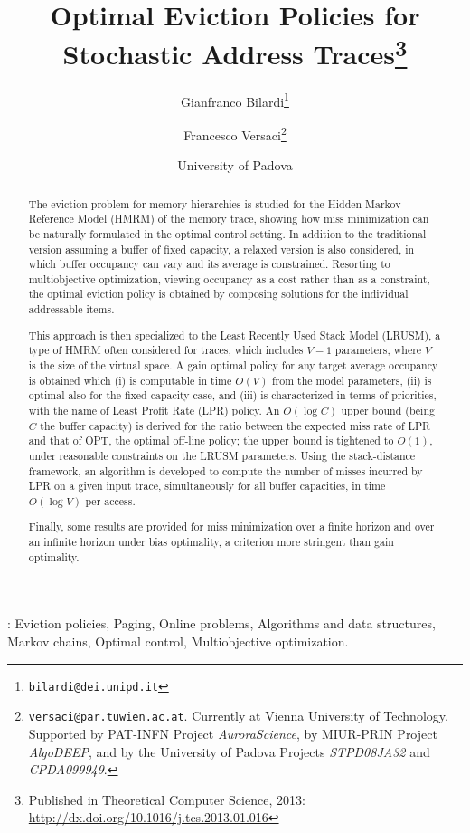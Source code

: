 \documentclass[11pt,a4paper]{article}
\title{Optimal Eviction Policies for Stochastic Address
  Traces\footnote{Published in Theoretical Computer Science, 2013:
    \url{http://dx.doi.org/10.1016/j.tcs.2013.01.016}}}
\author{Gianfranco Bilardi\thanks{\texttt{bilardi@dei.unipd.it}} \and Francesco
  Versaci\thanks{\texttt{versaci@par.tuwien.ac.at}. {Currently at Vienna
      University of Technology. Supported by PAT-INFN Project
      \emph{AuroraScience}, by MIUR-PRIN Project \emph{AlgoDEEP}, and by the
      University of Padova Projects \emph{STPD08JA32} and \emph{CPDA099949}.}}}
\date{University of Padova}
\theoremstyle{definition}
\theoremstyle{remark}
\begin{document}
\maketitle

\begin{abstract}
  The eviction problem for memory hierarchies is studied for the
  Hidden Markov Reference Model (HMRM) of the memory trace,
  showing how miss minimization can be naturally formulated in
  the optimal control setting.
    In addition to the traditional version assuming a buffer of fixed
  capacity, a relaxed version is also considered, in which buffer
  occupancy can vary and its average is constrained.
    Resorting to multiobjective optimization, viewing occupancy as a
  cost rather than as a constraint, the optimal eviction policy is
  obtained by composing solutions for the individual addressable
  items.

  This approach is then specialized to the Least Recently Used Stack Model
  (LRUSM), a type of HMRM often considered for traces, which includes $V-1$
  parameters, where $V$ is the size of the virtual space. A gain optimal policy
  for any target average occupancy is obtained which (i) is computable in time
  $O(V)$ from the model parameters, (ii) is optimal also for the fixed capacity
  case, and (iii) is characterized in terms of priorities, with the name of
  Least Profit Rate (LPR) policy. An $O(\log C)$ upper bound (being $C$ the
  buffer capacity) is derived for the ratio between the expected miss rate of
  LPR and that of OPT, the optimal off-line policy; the upper bound is tightened
  to $O(1)$, under reasonable constraints on the LRUSM parameters. Using the
  stack-distance framework, an algorithm is developed to compute the number of
  misses incurred by LPR on a given input trace, simultaneously for all buffer
  capacities, in time $O(\log V)$ per access.

  Finally, some results are provided for miss minimization over a
  finite horizon and over an infinite horizon under bias optimality,
  a criterion more stringent than gain optimality.

\end{abstract}

\vspace{5mm}
: Eviction policies, Paging, Online problems,
Algorithms and data structures, Markov chains, Optimal control,
Multiobjective optimization.
 
\end{document}
